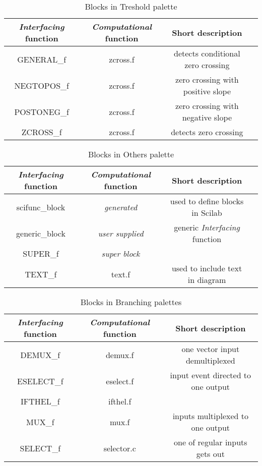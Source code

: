 \documentclass{book}
\newcommand{\computational}{{\em Computational }}
\newcommand{\interfacing}{{\em Interfacing }}
\begin{document}
\begin{table}[ht]
\begin{center}
\begin{tabular}{|c|c|c|c|}\hline
\interfacing function&\computational function&Short description\\
\hline
GENERAL\_f& zcross.f          & detects conditional zero crossing           \\
NEGTOPOS\_f& zcross.f          &   zero crossing with positive slope         \\
POSTONEG\_f&   zcross.f           &  zero crossing with negative slope         \\
ZCROSS\_f& zcross.f          &    detects zero crossing     \\ \hline   
\end{tabular}
\end{center}
\caption{Blocks in Treshold palette}
\end{table}

\begin{table}[ht]
\begin{center}
\begin{tabular}{|c|c|c|c|}\hline
\interfacing function&\computational function&Short description\\
\hline
scifunc\_block& {\em generated}          &  used to define blocks in Scilab          \\
generic\_block& {\em user supplied}      &  generic \interfacing function          \\
SUPER\_f& {\em super block}          &            \\   
TEXT\_f& text.f          &    used to include text in diagram        \\ \hline 
\end{tabular}
\end{center}
\caption{Blocks in Others palette}
\end{table}


\begin{table}[ht]
\begin{center}
\begin{tabular}{|c|c|c|} \hline
\interfacing function&\computational function&Short description\\ \hline
DEMUX\_f& demux.f          &  one vector input demultiplexed          \\
ESELECT\_f&   eselect.f                 &  input event directed to one output      \\
IFTHEL\_f&  ifthel.f         &            \\
MUX\_f&  mux.f         &inputs multiplexed to one output            \\
SELECT\_f&   selector.c        &   one of regular inputs gets out         \\ \hline 
\end{tabular}
\end{center}
\caption{Blocks in Branching palettes}
\label{ttte}
\end{table}
\end{document}
